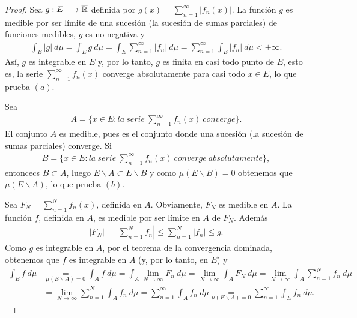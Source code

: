 \begin{proof}
    Sea $g: E \longrightarrow \overline{\mathbb{R}}$ definida por $g(x) = \sum_{n=1}^{\infty}{|f_n(x)|}$. La función $g$ es medible por ser límite de una sucesión (la sucesión de sumas parciales) de funciones medibles, $g$ es no negativa y
    \begin{align*}
        \int_{E}{|g| \ d\mu} = \int_{E}{g \ d\mu} = \int_{E}{\sum_{n=1}^{\infty}{|f_n|} \ d\mu} =  \sum_{n=1}^{\infty}{\int_{E}{|f_n| \ d\mu}} < +\infty.
    \end{align*}
    Así, $g$ es integrable en $E$ y, por lo tanto, $g$ es finita en casi todo punto de $E$, esto es, la serie $\sum_{n=1}^{\infty}{f_n(x)}$ converge absolutamente para casi todo $x \in E$, lo que prueba $(a)$.

    Sea
    \begin{align*}
        A = \{ x \in E : la \ serie \ \sum_{n=1}^{\infty}{f_n(x)} \ converge\}.
    \end{align*}
    El conjunto $A$ es medible, pues es el conjunto donde una sucesión (la sucesión de sumas parciales) converge. Si
    \begin{align*}
        B = \{ x \in E : la \ serie \ \sum_{n=1}^{\infty}{f_n(x)} \ converge \ absolutamente\},
    \end{align*}
    entoncecs $B \subset A$, luego $E \backslash A \subset E \backslash B$ y como $\mu(E \backslash B) = 0$ obtenemos que $\mu(E \backslash A)$, lo que prueba $(b)$.

    Sea $F_N = \sum_{n=1}^{N}{f_n(x)}$, definida en $A$. Obviamente, $F_N$ es medible en $A$. La función $f$, definida en $A$, es medible por ser límite en $A$ de $F_N$. Además
    \begin{align*}
        |F_N| = |\sum_{n=1}^{N}{f_n}| \leq \sum_{n=1}^{N}{|f_n|} \leq g.
    \end{align*}
    Como $g$ es integrable en $A$, por el teorema de la convergencia dominada, obtenemos que $f$ es integrable en $A$ (y, por lo tanto, en $E$) y
    \begin{align*}
        \int_{E}{f \ d\mu} & \underset{\mu(E \backslash A) = 0}{=} \int_{A}{f \ d\mu} = \int_{A}{\lim_{N \to \infty}{F_n} \ d\mu} = \lim_{N \to \infty}{\int_{A}{F_N \ d\mu}} = \lim_{N \to \infty}{\int_{A}}{\sum_{n=1}^{N}{f_n} \ d\mu} \\
                           & = \lim_{N \to \infty}{\sum_{n = 1}^{N}{\int_{A}{f_n} \ d\mu}} = {\sum_{n = 1}^{\infty}{\int_{A}{f_n} \ d\mu}} \underset{\mu(E \backslash A) = 0}{=} {\sum_{n = 1}^{\infty}{\int_{E}{f_n} \ d\mu}}.
    \end{align*}
\end{proof}

